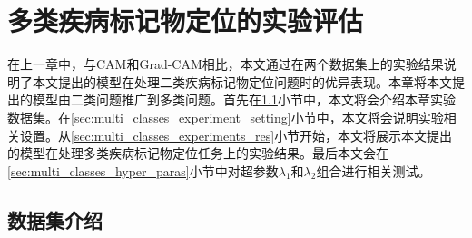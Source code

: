 \chapter{多类疾病标记物定位的实验评估}\label{sec:multi_classes}
在上一章中，与CAM和Grad-CAM相比，本文通过在两个数据集上的实验结果说明了本文提出的模型在处理二类疾病标记物定位问题时的优异表现。本章将本文提出的模型由二类问题推广到多类问题。首先在\ref{sec:mul_classes_ds_intro}小节中，本文将会介绍本章实验数据集。在\ref{sec:multi_classes_experiment_setting}小节中，本文将会说明实验相关设置。从\ref{sec:multi_classes_experiments_res}小节开始，本文将展示本文提出的模型在处理多类疾病标记物定位任务上的实验结果。最后本文会在\ref{sec:multi_classes_hyper_paras}小节中对超参数$\lambda_{1}$和$\lambda_{2}$组合进行相关测试。
\section{数据集介绍}\label{sec:mul_classes_ds_intro}
